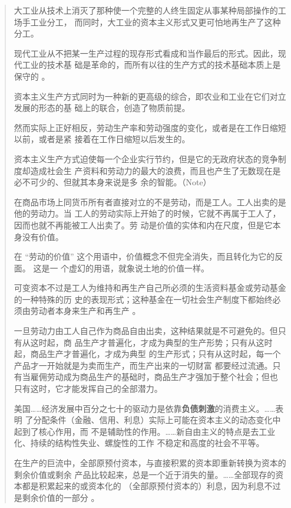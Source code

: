 \begin{quotation}
大工业从技术上消灭了那种使一个完整的人终生固定从事某种局部操作的工场手工业分工，
而同时，大工业的资本主义形式又更可怕地再生产了这种分工。

现代工业从不把某一生产过程的现存形式看成和当作最后的形式。因此，现代工业的技术基
础是革命的，而所有以往的生产方式的技术基础本质上是保守的
。

资本主义生产方式同时为一种新的更高级的综合，即农业和工业在它们对立发展的形态的基
础上的联合，创造了物质前提。

然而实际上正好相反，劳动生产率和劳动强度的变化，或者是在工作日缩短以前，或者是紧
接着在工作日缩短以后发生的。

资本主义生产方式迫使每一个企业实行节约，但是它的无政府状态的竞争制度却造成社会生
产资料和劳动力的最大的浪费，而且也产生了无数现在是必不可少的、但就其本身来说是多
余的智能。（Note）

在商品市场上同货币所有者直接对立的不是劳动，而是工人。工人出卖的是他的劳动力。当
工人的劳动实际上开始了的时候，它就不再属于工人了，因而也就不再能被工人出卖了。劳
动是价值的实体和内在尺度，但是它本身没有价值。

在 “劳动的价值” 这个用语中，价值概念不但完全消失，而且转化为它的反面。 这是一
个虚幻的用语，就象说土地的价值一样。


可变资本不过是工人为维持和再生产自己所必须的生活资料基金或劳动基金的一种特殊的历
史的表现形式；这种基金在一切社会生产制度下都始终必须由劳动者本身来生产和再生产
。

一旦劳动力由工人自己作为商品自由出卖，这种结果就是不可避免的。但只有从这时起，商
品生产才普遍化，才成为典型的生产形势；只有从这时起，商品生产才普遍化，才成为典型
的生产形式；只有从这时起，每一个产品才一开始就是为卖而生产，而生产出来的一切财富
都要经过流通。只有当雇佣劳动成为商品生产的基础时，商品生产才强加于整个社会；但也
只有这时，它才能发挥自己的全部潜力。

美国……经济发展中百分之七十的驱动力是依靠\textbf{负债刺激}的消费主义。……表明
了分配条件（金融、信用、利息）实际上可能在资本主义的动态变化中起到了核心作用，而
不是辅助性的作用。……新自由主义的特点是去工业化、持续的结构性失业、螺旋性的工作
不稳定和高度的社会不平等。




在生产的巨流中，全部原预付资本，与直接积累的资本即重新转换为资本的剩余价值或剩余
产品比较起来，总是一个近于消失的量。……全部现存的资本都是积累起来的或资本化的
（全部原预付资本的）利息，因为利息不过是剩余价值的一部分
。


\end{quotation}
